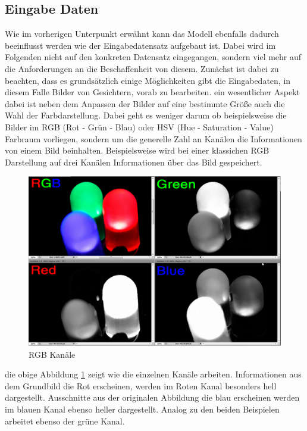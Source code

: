 \documentclass[12pt, a4paper]{report}
\newcommand*\setcaptioncitation[1]{\def\captioncitation{\textit{Quelle:}~#1}}
\let\captioncitation\relax
\begin{document}
\subsection{Eingabe Daten}
\label{subsec: Eingabe Daten}
Wie im vorherigen Unterpunkt erwähnt kann das Modell ebenfalls dadurch beeinflusst werden wie der Eingabedatensatz aufgebaut ist. Dabei wird im Folgenden nicht auf den konkreten Datensatz eingegangen, sondern viel mehr auf die Anforderungen an die Beschaffenheit von diesem. Zunächst ist dabei zu beachten, dass es grundsätzlich einige Möglichkeiten gibt die Eingabedaten, in diesem Falle Bilder von Gesichtern, vorab zu bearbeiten. ein wesentlicher Aspekt dabei ist neben dem Anpassen der Bilder auf eine bestimmte Größe auch die Wahl der Farbdarstellung. Dabei geht es weniger darum ob beispielsweise die Bilder im RGB (Rot - Grün - Blau) oder HSV (Hue - Saturation - Value) Farbraum vorliegen, sondern um die generelle Zahl an Kanälen die Informationen von einem Bild beinhalten.
Beispielsweise wird bei einer klassichen RGB Darstellung auf drei Kanälen Informationen über das Bild gespeichert. 
\begin{figure}[h]
\includegraphics[width=\linewidth]{Bilder/RGB.png}
\setcaptioncitation{ https://www.howtogeek.com/wp-content/uploads/2011/02/sshot-74.png}
\caption{RGB Kanäle}
\label{fig: RGB}
\end{figure}
die obige Abbildung \ref{fig: RGB} zeigt wie die einzelnen Kanäle arbeiten. Informationen aus dem Grundbild die Rot erscheinen, werden im Roten Kanal besonders hell dargestellt. 
Ausschnitte aus der originalen Abbildung die blau erscheinen werden im blauen Kanal ebenso heller dargestellt. Analog zu den beiden Beispielen arbeitet ebenso der grüne Kanal.
\end{document}
